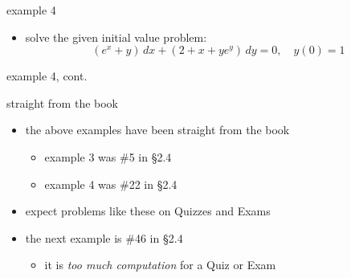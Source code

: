 \documentclass{beamer}
\begin{document}
\begin{frame}{example 4}

\begin{itemize}
\item solve the given initial value problem:
    $$(e^x+y)\,dx + (2+x+ye^y)\,dy = 0, \quad y(0)=1$$
\end{itemize}

\vspace{60mm}
\end{frame}


\begin{frame}{example 4, cont.}

\end{frame}


\begin{frame}{straight from the book}

\begin{itemize}
\item the above examples have been straight from the book
    \begin{itemize}
    \item example 3 was \#5 in \S 2.4
    \item example 4 was \#22 in \S 2.4
    \end{itemize}
\item expect problems like these on Quizzes and Exams

\bigskip \bigskip
\item the next example is \#46 in \S 2.4
    \begin{itemize}
    \item it is \emph{too much computation} for a Quiz or Exam
    \end{itemize}
\end{itemize}
\end{frame}
\end{document}
